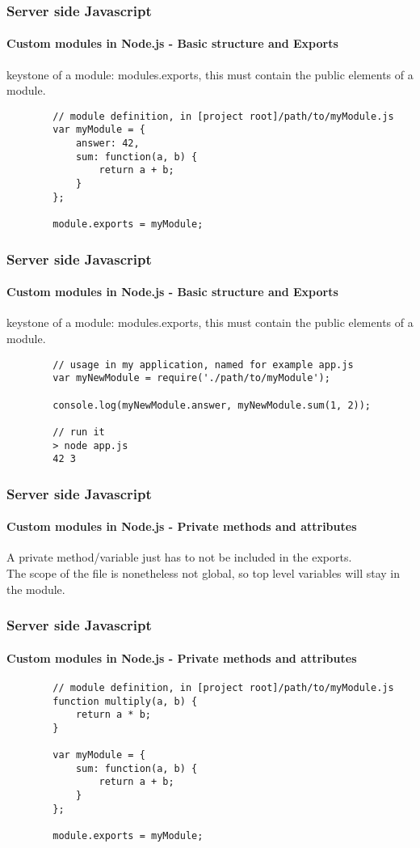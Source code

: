 \documentclass{beamer}
\begin{document}
	\begin{frame}[fragile]
		\frametitle{Server side Javascript}
		\framesubtitle{Custom modules in Node.js - Basic structure and Exports}

		keystone of a module: modules.exports, this must contain the public
		elements of a module.
		\begin{verbatim}
		// module definition, in [project root]/path/to/myModule.js
		var myModule = {
		    answer: 42,
		    sum: function(a, b) {
		        return a + b;
		    }
		};

		module.exports = myModule;
		\end{verbatim}
	\end{frame}

	\begin{frame}[fragile]
		\frametitle{Server side Javascript}
		\framesubtitle{Custom modules in Node.js - Basic structure and Exports}

		keystone of a module: modules.exports, this must contain the public
		elements of a module.
		\begin{verbatim}
		// usage in my application, named for example app.js
		var myNewModule = require('./path/to/myModule');

		console.log(myNewModule.answer, myNewModule.sum(1, 2));

		// run it
		> node app.js
		42 3
		\end{verbatim}
	\end{frame}

	\begin{frame}
		\frametitle{Server side Javascript}
		\framesubtitle{Custom modules in Node.js - Private methods and attributes}

		A private method/variable just has to not be included in the exports.\\
		The scope of the file is nonetheless not global, so top level variables
		will stay in the module.
	\end{frame}

	\begin{frame}[fragile]
		\frametitle{Server side Javascript}
		\framesubtitle{Custom modules in Node.js - Private methods and attributes}

		\begin{verbatim}
		// module definition, in [project root]/path/to/myModule.js
		function multiply(a, b) {
		    return a * b;
		}

		var myModule = {
		    sum: function(a, b) {
		        return a + b;
		    }
		};

		module.exports = myModule;
		\end{verbatim}
	\end{frame}
\end{document}

